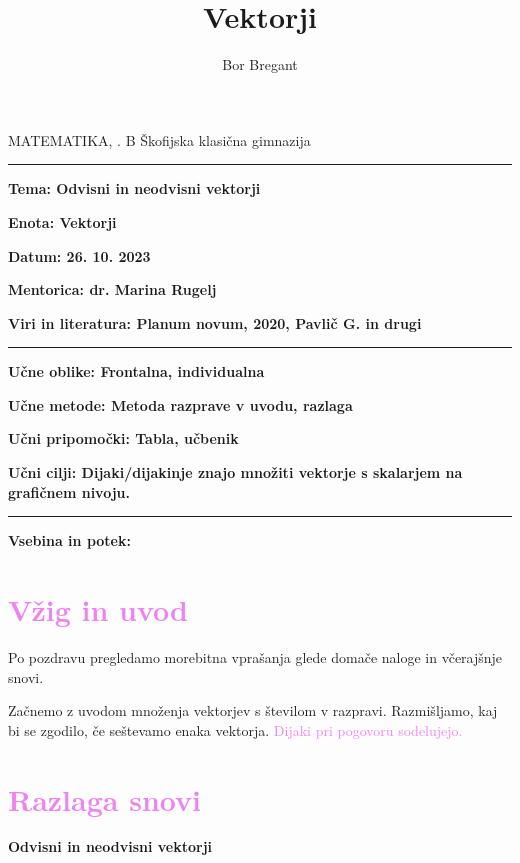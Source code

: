 \documentclass{article}
\title{Vektorji}
\author{Bor Bregant}
\date{\vspace{-5ex}}
\begin{document}
\thispagestyle{empty}	%

\noindent MATEMATIKA, . B \hfill Škofijska klasična gimnazija
\hrule
\vspace{1ex}
\noindent \textbf{Tema: Odvisni in neodvisni vektorji}
\vspace{1ex}

\noindent \textbf{Enota: Vektorji}
\vspace{1ex}

\noindent \textbf{Datum: 26. 10. 2023}
\vspace{1ex}

\noindent \textbf{Mentorica: dr. Marina Rugelj}
\vspace{1ex}

\noindent \textbf{Viri in literatura: Planum novum, 2020, Pavlič G. in drugi}
\vspace{1ex}
\hrule
\vspace{2ex}
\noindent \textbf{Učne oblike: Frontalna, individualna}
\vspace{1ex}

\noindent \textbf{Učne metode: Metoda razprave v uvodu, razlaga}
\vspace{1ex}

\noindent \textbf{Učni pripomočki: Tabla, učbenik}
\vspace{1ex}

\noindent \textbf{Učni cilji: Dijaki/dijakinje znajo množiti vektorje s skalarjem na grafičnem nivoju.} 
\vspace{4ex}
\hrule
\vspace{5ex}
\noindent \textbf{Vsebina in potek:} 

\newpage

\section*{\textcolor{violet}{Vžig in uvod}}

Po pozdravu pregledamo morebitna vprašanja glede domače naloge in včerajšnje snovi.

Začnemo z uvodom množenja vektorjev s številom v razpravi. Razmišljamo, kaj bi se zgodilo, če seštevamo enaka vektorja. \textcolor{violet}{Dijaki pri pogovoru sodelujejo.}


\section*{\textcolor{violet}{Razlaga snovi}}

\textbf{Odvisni in neodvisni vektorji}
\end{document}
